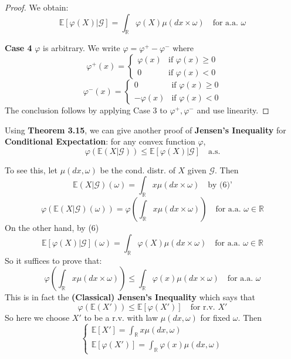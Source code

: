 \begin{proof}
We obtain:
\[
\mathbb{E}[\varphi(X) | \mathcal{G}] = \int_{\mathbb{R}} \varphi(X) \mu(dx \times \omega) \quad \text{for a.a. } \omega
\]

\textbf{Case 4} \(\varphi\) is arbitrary. We write \(\varphi = \varphi^+ - \varphi^-\) where 
\[
\varphi^+ (x) = 
\begin{cases} 
\varphi(x) & \text{if } \varphi(x) \geq 0 \\ 
0 & \text{if } \varphi(x) < 0 
\end{cases}
\]
\[
\varphi^- (x) = 
\begin{cases} 
0 & \text{if } \varphi(x) \geq 0 \\ 
-\varphi(x) & \text{if } \varphi(x) < 0 
\end{cases}
\]
The conclusion follows by applying Case 3 to \(\varphi^+, \varphi^-\) and use linearity.
\end{proof}



Using \textbf{Theorem 3.15}, we can give another proof of \textbf{Jensen's Inequality} for \textbf{Conditional Expectation}: for any convex function \(\varphi\),
\[
\varphi(\mathbb{E}(X | \mathcal{G})) \leq \mathbb{E}[\varphi(X) | \mathcal{G}] \quad \text{a.s.}
\]

To see this, let \(\mu(dx, \omega)\) be the cond. distr. of \(X\) given \(\mathcal{G}\). Then
\[
\mathbb{E}(X | \mathcal{G})(\omega) = \int_{\mathbb{R}} x \mu(dx \times \omega) \quad \text{by (6)'}
\]
\[
\varphi(\mathbb{E}(X | \mathcal{G})(\omega)) = \varphi \left( \int_{\mathbb{R}} x \mu(dx \times \omega) \right) \quad \text{for a.a. } \omega \in \mathbb{R}
\]
On the other hand, by (6)
\[
\mathbb{E}[\varphi(X) | \mathcal{G}](\omega) = \int_{\mathbb{R}} \varphi(X) \mu(dx \times \omega) \quad \text{for a.a. } \omega \in \mathbb{R}
\]
So it suffices to prove that:
\[
\varphi \left( \int_{\mathbb{R}} x \mu(dx \times \omega) \right) \leq \int_{\mathbb{R}} \varphi(x) \mu(dx \times \omega) \quad \text{for a.a. } \omega
\]
This is in fact the \textbf{(Classical) Jensen's Inequality} which says that
\[
\varphi(\mathbb{E}(X')) \leq \mathbb{E}[\varphi(X')] \quad \text{for r.v. } X'
\]
So here we choose \(X'\) to be a r.v. with law \(\mu(dx, \omega)\) for fixed \(\omega\). Then
\[
\begin{cases}
\mathbb{E}[X'] = \int_{\mathbb{R}} x \mu(dx, \omega) \\
\mathbb{E}[\varphi(X')] = \int_{\mathbb{R}} \varphi(x) \mu(dx, \omega)
\end{cases}
\]

